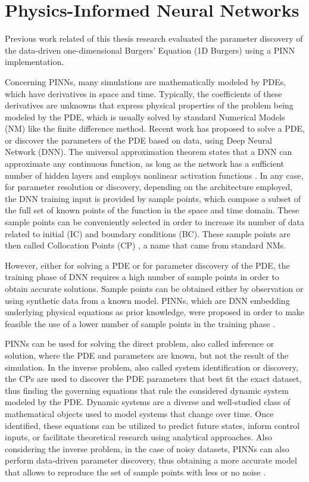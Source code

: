 \section{Physics-Informed Neural Networks}
\label{sec:pinn}

Previous work related of this thesis research evaluated the parameter discovery of the data-driven one-dimensional Burgers' Equation (1D Burgers) using a PINN implementation. 

Concerning PINNs, many simulations are mathematically modeled by PDEs, which have derivatives in space and time. Typically, the coefficients of these derivatives are unknowns that express physical properties of the problem being modeled by the PDE, which is usually solved by standard Numerical Models (NM) like the finite difference method. Recent work has proposed to solve a PDE, or discover the parameters of the PDE based on data, using Deep Neural Network (DNN). The universal approximation theorem states that a DNN can approximate any continuous function, as long as the network has a sufficient number of hidden layers and employs nonlinear activation functions \cite{Hornik1989}. In any case, for parameter resolution or discovery, depending on the architecture employed, the DNN training input is provided by sample points, which compose a subset of the full set of known points of the function in the space and time domain. These sample points can be conveniently selected in order to increase its number of data related to initial (IC) and boundary conditions (BC). These sample points are then called Collocation Points (CP) \cite{Basdevant1986}, a name that came from standard NMs. 

However, either for solving a PDE or for  parameter discovery of the PDE, the training phase of DNN requires a high number of sample points in order to obtain accurate solutions. Sample points can be obtained either by observation or using synthetic data from a known model. PINNs, which are DNN embedding underlying physical equations as prior knowledge, were proposed in order to make feasible the use of a lower number of sample points in the training phase \cite{Cuomo2022}. 

PINNs can be used for solving the direct problem, also called inference or solution, where the PDE and parameters are known, but not the result of the simulation. In the inverse problem, also called system identification or discovery, the CPs are used to discover the PDE parameters that best fit the exact dataset, thus finding the governing equations that rule the considered dynamic system modeled by the PDE. Dynamic systems are a diverse and well-studied class of mathematical objects used to model systems that change over time. Once identified, these equations can be utilized to predict future states, inform control inputs, or facilitate theoretical research using analytical approaches. Also considering the inverse problem, in the case of noisy datasets, PINNs can also perform data-driven parameter discovery, thus obtaining a more accurate model that allows to reproduce the set of sample points with less or no noise \cite{Zhou2024}.

